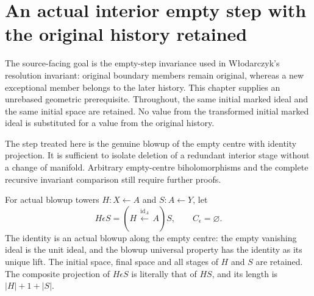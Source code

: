 \section{An actual interior empty step with the original history retained}
\label{chap:hironaka-original-interior-empty-history}

The source-facing goal is the empty-step invariance used in W\l odarczyk's
resolution invariant: original boundary members remain original, whereas a new
exceptional member belongs to the later history.  This chapter supplies an
unrebased geometric prerequisite.  Throughout, the same initial marked ideal
and the same initial space are retained.  No value from the transformed initial
marked ideal is substituted for a value from the original history.

The step treated here is the genuine blowup of the empty centre with identity
projection.  It is sufficient to isolate deletion of a redundant interior stage
without a change of manifold.  Arbitrary empty-centre biholomorphisms and the
complete recursive invariant comparison still require further proofs.

\begin{definition}
\label{hir:original-interior-empty-history}
\leanok
For actual blowup towers $H:X\leftarrow A$ and $S:A\leftarrow Y$, let
\[
 H\epsilon S=(H\,\xleftarrow{\mathrm{id}_A}\,A)S,
 \qquad C_\epsilon=\varnothing.
\]
The identity is an actual blowup along the empty centre: the empty vanishing
ideal is the unit ideal, and the blowup universal property has the identity as
its unique lift.  The initial space, final space and all stages of $H$ and $S$
are retained.  The composite projection of $H\epsilon S$ is literally that of
$HS$, and its length is $|H|+1+|S|$.
\end{definition}

